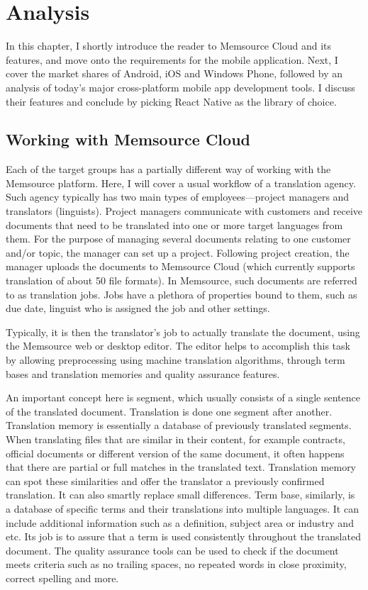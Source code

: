 \chapter{Analysis}

In this chapter, I shortly introduce the reader to Memsource Cloud and its features, and move onto the requirements for the mobile application. Next, I cover the market shares of Android, iOS and Windows Phone, followed by an analysis of today's major cross-platform mobile app development tools. I discuss their features and conclude by picking React Native as the library of choice. 

\section{Working with Memsource Cloud}

Each of the target groups has a partially different way of working with the Memsource platform. Here, I will cover a usual workflow of a translation agency. Such agency typically has two main types of employees---project managers and translators (linguists). Project managers communicate with customers and receive documents that need to be translated into one or more target languages from them. For the purpose of managing several documents relating to one customer and/or topic, the manager can set up a project. Following project creation, the manager uploads the documents to Memsource Cloud (which currently supports translation of about 50 file formats). In Memsource, such documents are referred to as translation jobs. Jobs have a plethora of properties bound to them, such as due date, linguist who is assigned the job and other settings.

Typically, it is then the translator's job to actually translate the document, using the Memsource web or desktop editor. The editor helps to accomplish this task by allowing preprocessing using machine translation algorithms, through term bases and translation memories and quality assurance features. 

An important concept here is segment, which usually consists of a single sentence of the translated document. Translation is done one segment after another. Translation memory  is essentially a database of previously translated segments. When translating files that are similar in their content, for example contracts, official documents or different version of the same document, it often happens that there are partial or full matches in the translated text. Translation memory can spot these similarities and offer the translator a previously confirmed translation. It can also smartly replace small differences. Term base,  similarly, is a database of specific terms and their translations into multiple languages. It can include additional information such as a definition, subject area or industry and etc. Its job is to assure that a term is used consistently throughout the translated document. The quality assurance tools can be used to check if the document meets criteria such as no trailing spaces, no repeated words in close proximity, correct spelling and more.

